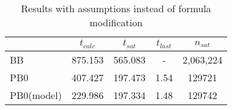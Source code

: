 \begin{wraptable}{l}{8cm}
\begin{tabular}{l| c c c c}
& $t_{calc}$ & $t_{sat}$ & $t_{last}$ & $n_{sat}$ \\
\hline
BB & 875.153 & 565.083 & - & 2,063,224\\
PB0 & 407.427 & 197.473 & 1.54 & 129721\\
PB0(model) & 229.986 & 197.334 & 1.48 & 129742\\
\end{tabular}
\caption{Results with assumptions instead of formula modification}
\label{tab:pofAssump}
\end{wraptable}